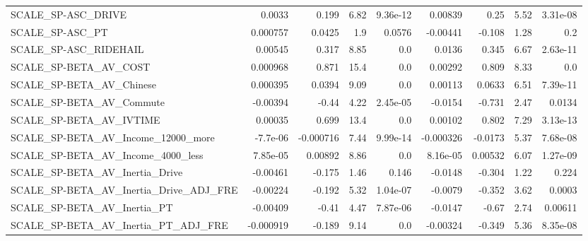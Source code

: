 \begin{tabular}{lrrrrrrrr}
SCALE\_SP-ASC\_DRIVE                                 &      0.0033 &        0.199 &     6.82 & 9.36e-12 &    0.00839 &        0.25 &         5.52 &      3.31e-08 \\
SCALE\_SP-ASC\_PT                                    &    0.000757 &       0.0425 &      1.9 &   0.0576 &   -0.00441 &      -0.108 &         1.28 &           0.2 \\
SCALE\_SP-ASC\_RIDEHAIL                              &     0.00545 &        0.317 &     8.85 &      0.0 &     0.0136 &       0.345 &         6.67 &      2.63e-11 \\
SCALE\_SP-BETA\_AV\_COST                              &    0.000968 &        0.871 &     15.4 &      0.0 &    0.00292 &       0.809 &         8.33 &           0.0 \\
SCALE\_SP-BETA\_AV\_Chinese                           &    0.000395 &       0.0394 &     9.09 &      0.0 &    0.00113 &      0.0633 &         6.51 &      7.39e-11 \\
SCALE\_SP-BETA\_AV\_Commute                           &    -0.00394 &        -0.44 &     4.22 & 2.45e-05 &    -0.0154 &      -0.731 &         2.47 &        0.0134 \\
SCALE\_SP-BETA\_AV\_IVTIME                            &     0.00035 &        0.699 &     13.4 &      0.0 &    0.00102 &       0.802 &         7.29 &      3.13e-13 \\
SCALE\_SP-BETA\_AV\_Income\_12000\_more                 &    -7.7e-06 &    -0.000716 &     7.44 & 9.99e-14 &  -0.000326 &     -0.0173 &         5.37 &      7.68e-08 \\
SCALE\_SP-BETA\_AV\_Income\_4000\_less                  &    7.85e-05 &      0.00892 &     8.86 &      0.0 &   8.16e-05 &     0.00532 &         6.07 &      1.27e-09 \\
SCALE\_SP-BETA\_AV\_Inertia\_Drive                     &    -0.00461 &       -0.175 &     1.46 &    0.146 &    -0.0148 &      -0.304 &         1.22 &         0.224 \\
SCALE\_SP-BETA\_AV\_Inertia\_Drive\_ADJ\_FRE             &    -0.00224 &       -0.192 &     5.32 & 1.04e-07 &    -0.0079 &      -0.352 &         3.62 &        0.0003 \\
SCALE\_SP-BETA\_AV\_Inertia\_PT                        &    -0.00409 &        -0.41 &     4.47 & 7.87e-06 &    -0.0147 &       -0.67 &         2.74 &       0.00611 \\
SCALE\_SP-BETA\_AV\_Inertia\_PT\_ADJ\_FRE                &   -0.000919 &       -0.189 &     9.14 &      0.0 &   -0.00324 &      -0.349 &         5.36 &      8.35e-08 \\

\end{tabular}
